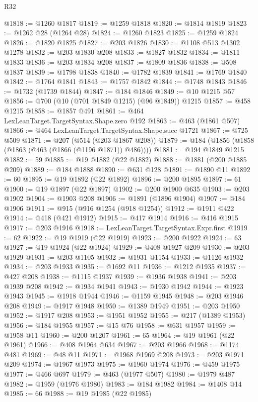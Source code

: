 \begin{lexlean}{R32}
\begin{coremodule}
@1818 := @1260 @1817
@1819 := @1259 @1818
@1820 := @1814 @1819
@1823 := @1262 @28 (@1264 @28)
@1824 := @1260 @1823
@1825 := @1259 @1824
@1826 := @1820 @1825
@1827 := @203 @1826
@1830 := @1108 @513 @1302 @1278
@1832 := @203 @1830 @208
@1833 := @1827 @1832
@1834 := @1811 @1833
@1836 := @203 @1834 @208
@1837 := @1809 @1836
@1838 := @508 @1837
@1839 := @1798 @1838
@1840 := @1782 @1839
@1841 := @1769 @1840
@1842 := @1764 @1841
@1843 := @1757 @1842
@1844 := @1748 @1843
@1846 := @1732 (@1739 @1844)
@1847 := @184 @1846
@1849 := @10 @1215 @57
@1856 := @700 (@10 (@701 @1849 @1215) (@96 @1849)) @1215
@1857 := @458 @1215
@1858 := @1857 @491
@1861 := @464 LexLeanTarget.TargetSyntax.Shape.zero @192
@1863 := @463 (@1861 @507)
@1866 := @464 LexLeanTarget.TargetSyntax.Shape.succ @1721
@1867 := @725 @509
@1871 := @207 (@514 (@203 @1867 @208))
@1879 := @184 (@1856 (@1858 (@1863 (@463 (@1866 (@1196 @1871)) @486))))
@1881 := @194 @1849 @1215
@1882 := 59
@1885 := @19 @1882 (@22 @1882)
@1888 := @1881 (@200 @1885 @209)
@1889 := @184 @1888
@1890 := @631 @128
@1891 := @1890 @11
@1892 := 60
@1895 := @19 @1892 (@22 @1892)
@1896 := @200 @1895
@1897 := 61
@1900 := @19 @1897 (@22 @1897)
@1902 := @200 @1900 @635
@1903 := @203 @1902
@1904 := @1903 @208
@1906 := @1891 (@1896 @1904)
@1907 := @184 @1906
@1911 := @915 (@916 @1254 (@918 @1254))
@1912 := @1911 @422
@1914 := @418 (@421 @1912)
@1915 := @417 @1914
@1916 := @416 @1915
@1917 := @203 @1916
@1918 := LexLeanTarget.TargetSyntax.Expr.first
@1919 := 62
@1922 := @19 @1919 (@22 @1919)
@1923 := @200 @1922
@1924 := 63
@1927 := @19 @1924 (@22 @1924)
@1929 := @408 @1927 @209
@1930 := @203 @1929
@1931 := @203 @1105
@1932 := @1931 @1154
@1933 := @1126 @1932
@1934 := @203 @1933
@1935 := @1692 @11
@1936 := @1212 @1935
@1937 := @427 @208
@1938 := @1115 @1937
@1939 := @1936 @1938
@1941 := @203 @1939 @208
@1942 := @1934 @1941
@1943 := @1930 @1942
@1944 := @1923 @1943
@1945 := @1918 @1944
@1946 := @1159 @1945
@1948 := @203 @1946 @208
@1949 := @1917 @1948
@1950 := @1389 @1949
@1951 := @203 @1950
@1952 := @1917 @208
@1953 := @1951 @1952
@1955 := @217 (@1389 @1953)
@1956 := @184 @1955
@1957 := @15 @76
@1958 := @631 @1957
@1959 := @1958 @11
@1960 := @200 @1207
@1961 := 65
@1964 := @19 @1961 (@22 @1961)
@1966 := @408 @1964 @634
@1967 := @203 @1966
@1968 := @1174 @481
@1969 := @48 @11
@1971 := @1968 @1969 @208
@1973 := @203 @1971 @209
@1974 := @1967 @1973
@1975 := @1960 @1974
@1976 := @459 @1975
@1977 := @466 @697
@1979 := @463 (@1977 @507)
@1980 := @1979 @487
@1982 := @1959 (@1976 @1980)
@1983 := @184 @1982
@1984 := @1408 @14
@1985 := 66
@1988 := @19 @1985 (@22 @1985)

\end{coremodule}
\end{lexlean}
